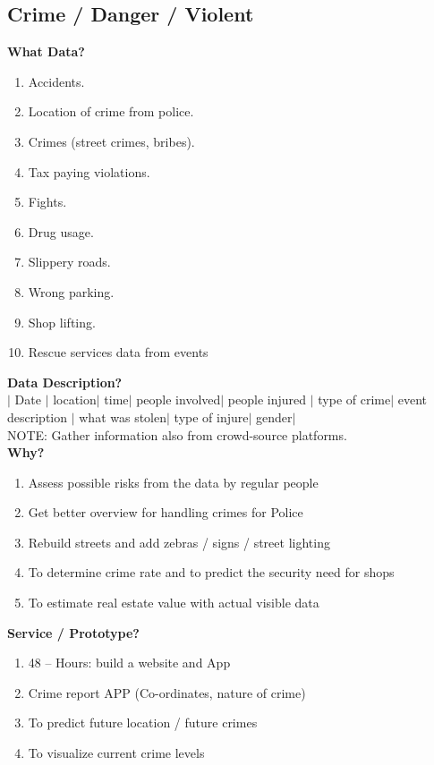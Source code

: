 \documentclass{article}
\begin{document}
\subsection*{\Large Crime / Danger / Violent}
\textbf{\large What Data?}
\begin{enumerate}
\item		Accidents.
\item		Location of crime from police.
\item		Crimes (street crimes, bribes).
\item 		Tax paying violations.
\item		Fights.
\item		Drug usage.
\item		Slippery roads.
\item		Wrong parking.
\item		Shop lifting.
\item		Rescue services data from events
\end{enumerate}
\textbf{\large Data Description?}\\
	\(|\) Date \(|\)  location\(|\)  time\(|\)  people involved\(|\)  people injured \(|\)  type of crime\(|\)  event description \(|\) what was stolen\(|\)  type of injure\(|\)  gender\(|\)  \\
	NOTE: Gather information also from crowd-source platforms.\\
	\textbf{\large Why?}
	\begin{enumerate}
\item			Assess possible risks from the data by regular people
\item			Get better overview for handling crimes for Police
\item			Rebuild streets and add zebras / signs / street lighting
\item			To determine crime rate and to predict the security need for shops
\item			To estimate real estate value with actual visible data
	\end{enumerate}

	\textbf{\large Service / Prototype?}	
	\begin{enumerate}
\item	48 – Hours: build a website and App
\item	Crime report APP (Co-ordinates, nature of crime)
\item	To predict future location / future crimes
\item	To visualize current crime levels
	\end{enumerate}
\end{document}
